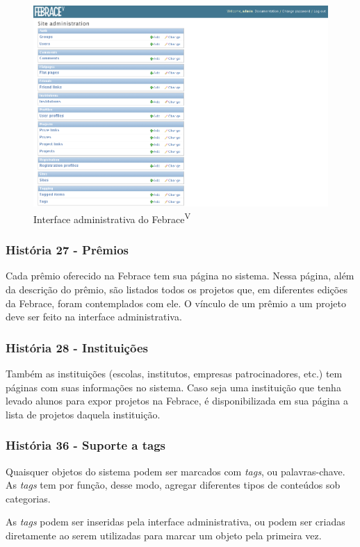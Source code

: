     \begin{figure}[h]
        \begin{center}
    \includegraphics[width=0.7\linewidth]{arquivos/admin.png}
        \end{center}
        \caption{Interface administrativa do Febrace\textsuperscript{V}}
        \label{admin}
    \end{figure}

    \subsubsection{História 27 - Prêmios}
      Cada prêmio oferecido na Febrace tem sua página no sistema. Nessa página, além da descrição do prêmio, são listados todos os projetos que, em diferentes edições da Febrace, foram contemplados com ele. O vínculo de um prêmio a um projeto deve ser feito na interface administrativa.

    \subsubsection{História 28 - Instituições}
      Também as instituições (escolas, institutos, empresas patrocinadores, etc.) tem páginas com suas informações no sistema. Caso seja uma instituição que tenha levado alunos para expor projetos na Febrace, é disponibilizada em sua página a lista de projetos daquela instituição.

    \subsubsection{História 36 - Suporte a tags}
      Quaisquer objetos do sistema podem ser marcados com \textit{tags}, ou palavras-chave. As \textit{tags} tem por função, desse modo, agregar diferentes tipos de conteúdos sob categorias.

      As \textit{tags} podem ser inseridas pela interface administrativa, ou podem ser criadas diretamente ao serem utilizadas para marcar um objeto pela primeira vez.

